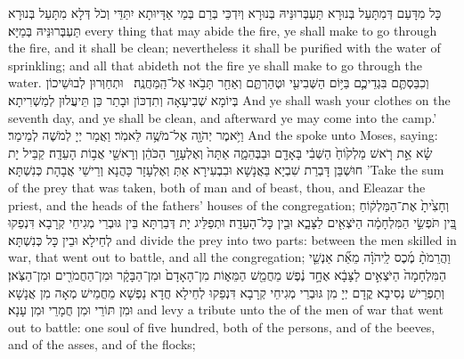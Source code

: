 {כָּל מִדָּעַם דְּמִתָּעַל בְּנוּרָא תַּעְבְּרוּנֵּיהּ בְּנוּרָא וְיִדְכֵּי בְּרַם בְּמֵי אַדָּיוּתָא יִתַּדֵּי וְכֹל דְּלָא מִתָּעַל בְּנוּרָא תַּעְבְּרוּנֵּיהּ בְּמַיָּא׃}
{every thing that may abide the fire, ye shall make to go through the fire, and it shall be clean; nevertheless it shall be purified with the water of sprinkling; and all that abideth not the fire ye shall make to go through the water.}{}
{וְכִבַּסְתֶּ֧ם בִּגְדֵיכֶ֛ם בַּיּ֥וֹם הַשְּׁבִיעִ֖י וּטְהַרְתֶּ֑ם וְאַחַ֖ר תָּבֹ֥אוּ אֶל־הַֽמַּחֲנֶֽה׃ \setuma 
{}}
{וּתְחַוְּרוּן לְבוּשֵׁיכוֹן בְּיוֹמָא שְׁבִיעָאָה וְתִדְכּוֹן וּבָתַר כֵּן תֵּיעֲלוּן לְמַשְׁרִיתָא׃}
{And ye shall wash your clothes on the seventh day, and ye shall be clean, and afterward ye may come into the camp.’}{}
{וַיֹּ֥אמֶר יְהֹוָ֖ה אֶל־מֹשֶׁ֥ה לֵּאמֹֽר׃}
{וַאֲמַר יְיָ לְמֹשֶׁה לְמֵימַר׃}
{And the \lord\space spoke unto Moses, saying:}{}
{שָׂ֗א אֵ֣ת רֹ֤אשׁ מַלְק֙וֹחַ֙ הַשְּׁבִ֔י בָּאָדָ֖ם וּבַבְּהֵמָ֑ה אַתָּה֙ וְאֶלְעָזָ֣ר הַכֹּהֵ֔ן וְרָאשֵׁ֖י אֲב֥וֹת הָעֵדָֽה׃
}
{קַבֵּיל יָת חוּשְׁבַּן דָּבְרַת שִׁבְיָא בַּאֲנָשָׁא וּבִבְעִירָא אַתְּ וְאֶלְעָזָר כָּהֲנָא וְרֵישֵׁי אֲבָהָת כְּנִשְׁתָּא׃}
{’Take the sum of the prey that was taken, both of man and of beast, thou, and Eleazar the priest, and the heads of the fathers’ houses of the congregation;}{}
{וְחָצִ֙יתָ֙ אֶת־הַמַּלְק֔וֹחַ בֵּ֚ין תֹּפְשֵׂ֣י הַמִּלְחָמָ֔ה הַיֹּצְאִ֖ים לַצָּבָ֑א וּבֵ֖ין כׇּל־הָעֵדָֽה׃
}
{וּתְפַלֵּיג יָת דְּבַרְתָּא בֵּין גּוּבְרֵי מְגִיחֵי קְרָבָא דִּנְפַקוּ לְחֵילָא וּבֵין כָּל כְּנִשְׁתָּא׃}
{and divide the prey into two parts: between the men skilled in war, that went out to battle, and all the congregation;}{}
{וַהֲרֵמֹתָ֨ מֶ֜כֶס לַֽיהֹוָ֗ה מֵאֵ֞ת אַנְשֵׁ֤י הַמִּלְחָמָה֙ הַיֹּצְאִ֣ים לַצָּבָ֔א אֶחָ֣ד נֶ֔פֶשׁ מֵחֲמֵ֖שׁ הַמֵּא֑וֹת מִן־הָאָדָם֙ וּמִן־הַבָּקָ֔ר וּמִן־הַחֲמֹרִ֖ים וּמִן־הַצֹּֽאן׃}
{וְתַפְרֵישׁ נְסִיבָא קֳדָם יְיָ מִן גּוּבְרֵי מְגִיחֵי קְרָבָא דִּנְפַקוּ לְחֵילָא חֲדָא נַפְשָׁא מֵחֲמֵישׁ מְאָה מִן אֲנָשָׁא וּמִן תּוֹרֵי וּמִן חֲמָרֵי וּמִן עָנָא׃}
{and levy a tribute unto the \lord\space of the men of war that went out to battle: one soul of five hundred, both of the persons, and of the beeves, and of the asses, and of the flocks;}{}
